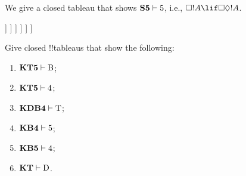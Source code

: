 \documentclass[../../../include/open-logic-section]{subfiles}
\begin{document}
\begin{ex}
  We give a closed tableau that shows $\Log{S5} \Proves \Ax{5}$, i.e.,
  $\Box!A \lif \Box\Diamond!A$.
  \begin{oltableau}
    [\pFmla{\False}{\Box\formula{A} \lif \Box\Diamond \formula{A}}{1},
      just = \TAss
      [\pFmla{\True}{\Box \formula{A}}{1}, just = {\TRule{\False}{\lif}[1]}
        [\pFmla{\False}{\Box\Diamond \formula{A}}{1},
          just = {\TRule{\False}{\lif}[1]}
          [\pFmla{\False}{\Diamond \formula{A}}{1.1},
            just = {\TRule{\False}{\Box}[3]}
            [\pFmla{\False}{\Diamond \formula{A}}{1},
              just = {4r$\Diamond$ 4}
              [\pFmla{\False}{\formula{A}}{1.1},
                just = {\TRule{\False}{\Diamond}[5]}
                [\pFmla{\True}{\formula{A}}{1.1},
                  just = {\TRule{\True}{\Box}[2]}, close]
              ]
            ]
          ]
        ]
      ]
    ]
  \end{oltableau}
\end{ex}

\begin{prob}
Give closed !!{tableau}s that show the following:
  \begin{enumerate}
  \item $\Log{KT5} \Proves \Ax{B}$;
  \item $\Log{KT5} \Proves \Ax{4}$;
  \item $\Log{KDB4} \Proves \Ax{T}$;
  \item $\Log{KB4} \Proves \Ax{5}$;
  \item $\Log{KB5} \Proves \Ax{4}$;
  \item $\Log{KT} \Proves \Ax{D}$.
  \end{enumerate}
\end{prob}
\end{document}
